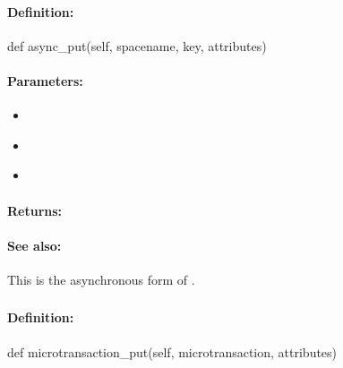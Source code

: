 \paragraph{Definition:}
\begin{pythoncode}
def async_put(self, spacename, key, attributes)
\end{pythoncode}

\paragraph{Parameters:}
\begin{itemize}[noitemsep]
\item {}\\

\item {}\\

\item {}\\

\end{itemize}

\paragraph{Returns:}


\paragraph{See also:}  This is the asynchronous form of .

\pagebreak
\subsubsection{}
\label{api:python:microtransaction_put}


\paragraph{Definition:}
\begin{pythoncode}
def microtransaction_put(self, microtransaction, attributes)
\end{pythoncode}

